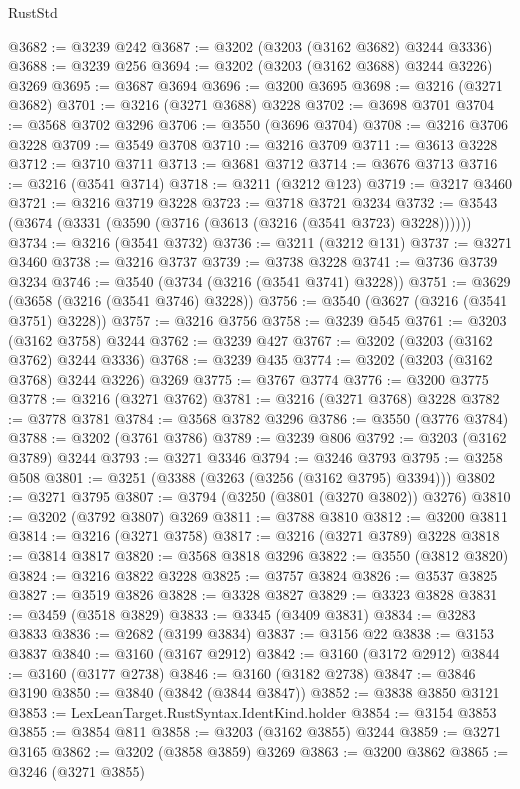 \begin{lexlean}{RustStd}
\begin{coremodule}
@3682 := @3239 @242
@3687 := @3202 (@3203 (@3162 @3682) @3244 @3336)
@3688 := @3239 @256
@3694 := @3202 (@3203 (@3162 @3688) @3244 @3226) @3269
@3695 := @3687 @3694
@3696 := @3200 @3695
@3698 := @3216 (@3271 @3682)
@3701 := @3216 (@3271 @3688) @3228
@3702 := @3698 @3701
@3704 := @3568 @3702 @3296
@3706 := @3550 (@3696 @3704)
@3708 := @3216 @3706 @3228
@3709 := @3549 @3708
@3710 := @3216 @3709
@3711 := @3613 @3228
@3712 := @3710 @3711
@3713 := @3681 @3712
@3714 := @3676 @3713
@3716 := @3216 (@3541 @3714)
@3718 := @3211 (@3212 @123)
@3719 := @3217 @3460
@3721 := @3216 @3719 @3228
@3723 := @3718 @3721 @3234
@3732 := @3543 (@3674 (@3331 (@3590 (@3716 (@3613 (@3216 (@3541 @3723) @3228))))))
@3734 := @3216 (@3541 @3732)
@3736 := @3211 (@3212 @131)
@3737 := @3271 @3460
@3738 := @3216 @3737
@3739 := @3738 @3228
@3741 := @3736 @3739 @3234
@3746 := @3540 (@3734 (@3216 (@3541 @3741) @3228))
@3751 := @3629 (@3658 (@3216 (@3541 @3746) @3228))
@3756 := @3540 (@3627 (@3216 (@3541 @3751) @3228))
@3757 := @3216 @3756
@3758 := @3239 @545
@3761 := @3203 (@3162 @3758) @3244
@3762 := @3239 @427
@3767 := @3202 (@3203 (@3162 @3762) @3244 @3336)
@3768 := @3239 @435
@3774 := @3202 (@3203 (@3162 @3768) @3244 @3226) @3269
@3775 := @3767 @3774
@3776 := @3200 @3775
@3778 := @3216 (@3271 @3762)
@3781 := @3216 (@3271 @3768) @3228
@3782 := @3778 @3781
@3784 := @3568 @3782 @3296
@3786 := @3550 (@3776 @3784)
@3788 := @3202 (@3761 @3786)
@3789 := @3239 @806
@3792 := @3203 (@3162 @3789) @3244
@3793 := @3271 @3346
@3794 := @3246 @3793
@3795 := @3258 @508
@3801 := @3251 (@3388 (@3263 (@3256 (@3162 @3795) @3394)))
@3802 := @3271 @3795
@3807 := @3794 (@3250 (@3801 (@3270 @3802)) @3276)
@3810 := @3202 (@3792 @3807) @3269
@3811 := @3788 @3810
@3812 := @3200 @3811
@3814 := @3216 (@3271 @3758)
@3817 := @3216 (@3271 @3789) @3228
@3818 := @3814 @3817
@3820 := @3568 @3818 @3296
@3822 := @3550 (@3812 @3820)
@3824 := @3216 @3822 @3228
@3825 := @3757 @3824
@3826 := @3537 @3825
@3827 := @3519 @3826
@3828 := @3328 @3827
@3829 := @3323 @3828
@3831 := @3459 (@3518 @3829)
@3833 := @3345 (@3409 @3831)
@3834 := @3283 @3833
@3836 := @2682 (@3199 @3834)
@3837 := @3156 @22
@3838 := @3153 @3837
@3840 := @3160 (@3167 @2912)
@3842 := @3160 (@3172 @2912)
@3844 := @3160 (@3177 @2738)
@3846 := @3160 (@3182 @2738)
@3847 := @3846 @3190
@3850 := @3840 (@3842 (@3844 @3847))
@3852 := @3838 @3850 @3121
@3853 := LexLeanTarget.RustSyntax.IdentKind.holder
@3854 := @3154 @3853
@3855 := @3854 @811
@3858 := @3203 (@3162 @3855) @3244
@3859 := @3271 @3165
@3862 := @3202 (@3858 @3859) @3269
@3863 := @3200 @3862
@3865 := @3246 (@3271 @3855)

\end{coremodule}
\end{lexlean}
